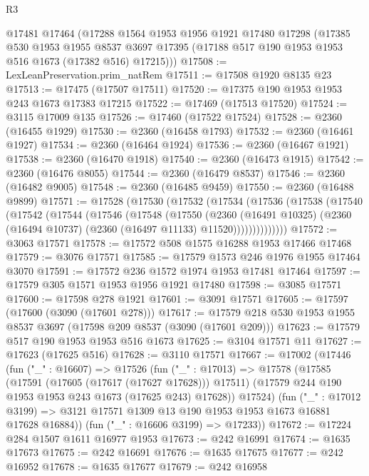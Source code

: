 \begin{lexlean}{R3}
\begin{coremodule}
    @17481
    @17464
    (@17288
      @1564
      @1953
      @1956
      @1921
      @17480
      @17298
      (@17385
        @530
        @1953
        @1955
        @8537
        @3697
        @17395
        (@17188 @517 @190 @1953 @1953 @516 @1673 (@17382 @516) @17215)))
@17508 := LexLeanPreservation.prim_natRem
@17511 := @17508 @1920 @8135 @23
@17513 := @17475 (@17507 @17511)
@17520 := @17375 @190 @1953 @1953 @243 @1673 @17383 @17215
@17522 := @17469 (@17513 @17520)
@17524 := @3115 @17009 @135
@17526 := @17460 (@17522 @17524)
@17528 := @2360 (@16455 @1929)
@17530 := @2360 (@16458 @1793)
@17532 := @2360 (@16461 @1927)
@17534 := @2360 (@16464 @1924)
@17536 := @2360 (@16467 @1921)
@17538 := @2360 (@16470 @1918)
@17540 := @2360 (@16473 @1915)
@17542 := @2360 (@16476 @8055)
@17544 := @2360 (@16479 @8537)
@17546 := @2360 (@16482 @9005)
@17548 := @2360 (@16485 @9459)
@17550 := @2360 (@16488 @9899)
@17571 := @17528
    (@17530
      (@17532
        (@17534
          (@17536
            (@17538
              (@17540
                (@17542
                  (@17544
                    (@17546
                      (@17548
                        (@17550
                          (@2360
                            (@16491 @10325)
                            (@2360 (@16494 @10737) (@2360 (@16497 @11133) @11520))))))))))))))
@17572 := @3063 @17571
@17578 := @17572 @508 @1575 @16288 @1953 @17466 @17468
@17579 := @3076 @17571
@17585 := @17579 @1573 @246 @1976 @1955 @17464 @3070
@17591 := @17572 @236 @1572 @1974 @1953 @17481 @17464
@17597 := @17579 @305 @1571 @1953 @1956 @1921 @17480
@17598 := @3085 @17571
@17600 := @17598 @278 @1921
@17601 := @3091 @17571
@17605 := @17597 (@17600 (@3090 (@17601 @278)))
@17617 := @17579 @218 @530 @1953 @1955 @8537 @3697 (@17598 @209 @8537 (@3090 (@17601 @209)))
@17623 := @17579 @517 @190 @1953 @1953 @516 @1673
@17625 := @3104 @17571 @11
@17627 := @17623 (@17625 @516)
@17628 := @3110 @17571
@17667 := @17002
    (@17446
      (fun ("_" : @16607) =>
      @17526
        (fun ("_" : @17013) =>
        @17578
          (@17585
            (@17591 (@17605 (@17617 (@17627 @17628))) @17511)
            (@17579 @244 @190 @1953 @1953 @243 @1673 (@17625 @243) @17628))
          @17524)
        (fun ("_" : @17012 @3199) =>
        @3121 @17571 @1309 @13 @190 @1953 @1953 @1673 @16881 @17628 @16884))
      (fun ("_" : @16606 @3199) => @17233))
@17672 := @17224 @284 @1507 @1611 @16977 @1953
@17673 := @242 @16991
@17674 := @1635 @17673
@17675 := @242 @16691
@17676 := @1635 @17675
@17677 := @242 @16952
@17678 := @1635 @17677
@17679 := @242 @16958

\end{coremodule}
\end{lexlean}

